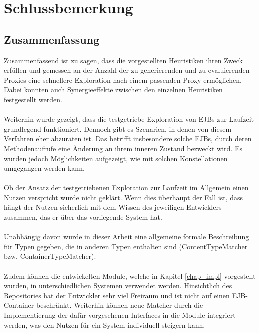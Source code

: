 \chapter{Schlussbemerkung}\label{chap_finish}
\section{Zusammenfassung}
Zusammenfassend ist zu sagen, dass die vorgestellten Heuristiken ihren Zweck erfüllen und gemessen an der Anzahl der zu generierenden und zu evaluierenden Proxies eine schnellere Exploration nach einem passenden Proxy ermöglichen. Dabei konnten auch Synergieeffekte zwischen den einzelnen Heuristiken festgestellt werden.
\\\\
Weiterhin wurde gezeigt, dass die testgetriebe Exploration von EJBs zur Laufzeit grundlegend funktioniert. Dennoch gibt es Szenarien, in denen von diesem Verfahren eher abzuraten ist. Das betrifft insbesondere solche EJBs, durch deren Methodenaufrufe eine Änderung an ihrem inneren Zustand bezweckt wird. Es wurden jedoch Möglichkeiten aufgezeigt, wie mit solchen Konstellationen umgegangen werden kann.
\\\\
Ob der Ansatz der testgetriebenen Exploration zur Laufzeit im Allgemein einen Nutzen verspricht wurde nicht geklärt. Wenn dies überhaupt der Fall ist, dass hängt der Nutzen sicherlich mit dem Wissen des jeweiligen Entwicklers zusammen, das er über das vorliegende System hat.
\\\\
Unabhängig davon wurde in dieser Arbeit eine allgemeine formale Beschreibung für Typen gegeben, die in anderen Typen enthalten sind (ContentTypeMatcher bzw. ContainerTypeMatcher). 
\\\\
Zudem können die entwickelten Module, welche in Kapitel \ref{chap_impl} vorgestellt wurden, in unterschiedlichen Systemen verwendet werden. Hinsichtlich des Repositories hat der Entwickler sehr viel Freiraum und ist nicht auf einen EJB-Container beschränkt. Weiterhin können neue Matcher durch die Implementierung der dafür vorgesehenen Interfaces in die Module integriert werden, was den Nutzen für ein System individuell steigern kann.
